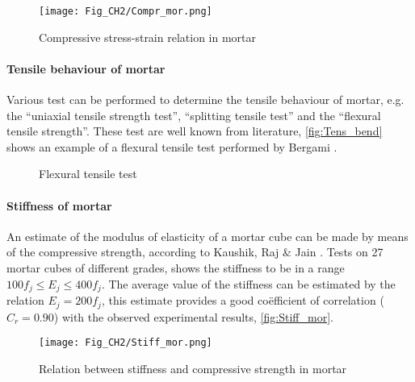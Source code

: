 \begin{figure}[!htb]
    \centering
    \texttt{[image: Fig\_CH2/Compr\_mor.png]}
    \caption{Compressive stress-strain relation in mortar \cite{kaushik2007}}
    \label{fig:Compr_mor}
\end{figure}

\paragraph{Tensile behaviour of mortar}
Various test can be performed to determine the tensile behaviour of mortar, e.g. the “uniaxial tensile strength test”, “splitting tensile test” and the
“flexural tensile strength”. These test are well known from literature, \autoref{fig:Tens_bend} shows an example of a flexural tensile test performed by Bergami \cite{bergami2007}.

\begin{figure}[!htb]
    \centering
     \hfill
    \caption{Flexural tensile test \cite{bergami2007}}
    \label{fig:Tens_bend}
\end{figure}

\paragraph{Stiffness of mortar}
An estimate of the modulus of elasticity of a mortar cube can be made by means of the compressive strength, according to Kaushik, Raj \& Jain \cite{kaushik2007}. Tests on 27 mortar cubes of different grades, shows the stiffness to be in a range $100f_{j} \leq E_{j} \leq 400f_{j}$. The average value of the stiffness can be estimated by the relation $E_{j} = 200f_{j}$, this estimate provides a good co\"{e}fficient of correlation ($C_{r} = 0.90$) with the observed experimental results, \autoref{fig:Stiff_mor}.

\begin{figure}[!htb]
    \centering
    \texttt{[image: Fig\_CH2/Stiff\_mor.png]}
    \caption{Relation between stiffness and compressive strength in mortar \cite{kaushik2007}}
    \label{fig:Stiff_mor}
\end{figure}

